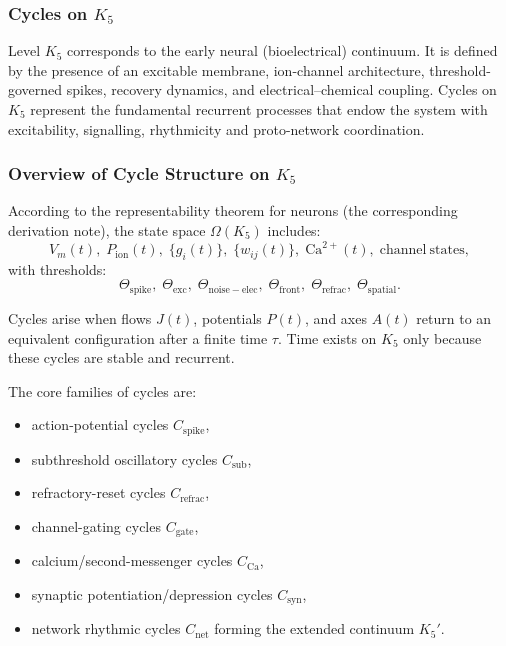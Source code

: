 
\subsubsection{Cycles on \texorpdfstring{$K_5$}{K_5}}
\label{sec:cycles-k5}

Level $K_5$ corresponds to the early neural (bioelectrical) continuum.
It is defined by the presence of an excitable membrane, ion-channel
architecture, threshold-governed spikes, recovery dynamics, and
electrical–chemical coupling.  
Cycles on $K_5$ represent the fundamental recurrent processes that endow
the system with excitability, signalling, rhythmicity and proto-network
coordination.

\subsubsection{Overview of Cycle Structure on \texorpdfstring{$K_5$}{K_5}}

According to the representability theorem for neurons (the corresponding derivation note),
the state space $\Omega(K_5)$ includes:
\[
  V_m(t),\;
  P_{\mathrm{ion}}(t),\;
  \{g_i(t)\},\;
  \{w_{ij}(t)\},\;
  \mathrm{Ca}^{2+}(t),\;
  \mathrm{channel\ states},
\]
with thresholds:
\[
  \Theta_{\mathrm{spike}},\;
  \Theta_{\mathrm{exc}},\;
  \Theta_{\mathrm{noise-elec}},\;
  \Theta_{\mathrm{front}},\;
  \Theta_{\mathrm{refrac}},\;
  \Theta_{\mathrm{spatial}}.
\]

Cycles arise when flows $J(t)$, potentials $P(t)$, and axes $A(t)$
return to an equivalent configuration after a finite time $\tau$.
Time exists on $K_5$ only because these cycles are stable and recurrent.

The core families of cycles are:

\begin{itemize}
  \item action-potential cycles $C_{\mathrm{spike}}$,
  \item subthreshold oscillatory cycles $C_{\mathrm{sub}}$,
  \item refractory-reset cycles $C_{\mathrm{refrac}}$,
  \item channel-gating cycles $C_{\mathrm{gate}}$,
  \item calcium/second-messenger cycles $C_{\mathrm{Ca}}$,
  \item synaptic potentiation/depression cycles $C_{\mathrm{syn}}$,
  \item network rhythmic cycles $C_{\mathrm{net}}$ forming the extended continuum $K_5'$.
\end{itemize}

